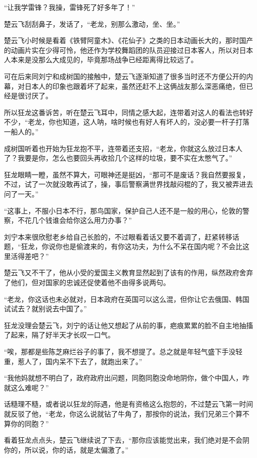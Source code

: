 “让我学雷锋？我操，雷锋死了好多年了！”

楚云飞刮刮鼻子，发话了，“老龙，别那么激动，坐、坐。”

楚云飞小时候是看着《铁臂阿童木》、《花仙子》之类的日本动画长大的，那时国产的动画片实在少得可怜，他还作为学校舞蹈团的队员迎接过日本客人，所以对日本人本来是没那么大成见的，毕竟那场战争已经距离得比较远了。

可在后来同刘宁和成树国的接触中，楚云飞逐渐知道了很多当时还不方便公开的内幕，对日本人的印象也跟着坏了起来，虽然还赶不上这俩战友那么深恶痛绝，但已经是很讨厌了。

所以狂龙这番诉苦，听在楚云飞耳中，同情之感大起，连带着对这人的看法也转好不少，“老龙，你也知道，这人呐，啥时候也有好人有坏人的，没必要一杆子打落一船人的。”

成树国听着也开始为狂龙抱不平，连带着还支招，“老龙，你就这么放过日本人了？我要是你，怎么也要回头再收拾几个这样的垃圾，要不实在太憋气了。”

狂龙眼睛一瞪，虽然不算大，可眼神还是挺凶，“那可不是废话？我自然要报复，不过，试了一次就没敢再试了，操，事后警察满世界找敲闷棍的了，我又被弄进去问了一天。”

“这事上，不服小日本不行，那鸟国家，保护自己人还不是一般的用心，伦敦的警察，不花几个钱谁会给你这么用力办事？”

刘宁本来很欣慰老乡给自己长脸的，不过眼看着话又要不着调了，赶紧转移话题，“狂龙，你说你也是偷渡来的，有你这功夫，为什么不呆在国内呢？不会比这里活得差吧？”

楚云飞又不干了，他从小受的爱国主义教育显然起到了该有的作用，纵然政府舍弃了他们，但对国家的忠诚还促使着他不由得多说两句。

“老龙，你这话也未必就对，日本政府在英国可以这么混，但你让它去俄国、韩国试试去？就别说去中国了。”

狂龙没理会楚云飞，刘宁的话让他又想起了从前的事，疤痕累累的脸不自主地抽搐了起来，隔了好半天才长叹一口气。

“唉，那都是些陈芝麻烂谷子的事了，我不想提了。总之就是年轻气盛下手没轻重，惹人了，国内呆不下去了，就跑出来了。”

“我他妈就想不明白了，政府政府出问题，同胞同胞没命地阴你，做个中国人，咋就这么难呢？”

话糙理不糙，或者说以狂龙的际遇，他是有资格这么抱怨的，不过楚云飞第一时间就反驳了他，“老龙，你这么说就钻了牛角了，那按你的说法，我们兄弟三个算不算你的同胞？”

看着狂龙点点头，楚云飞继续说了下去，“那你应该能觉出来，我们绝对是不会阴你的，所以说，你的话，就是太偏激了。”

